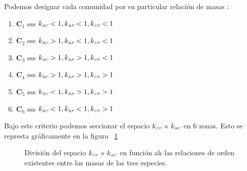 Podemos designar cada comunidad por su particular relaci\'on de masas :
\begin{enumerate}[label=(\alph*)]
\item $\mathbf{C}_1$ sss $k_{\textit{\tiny RC}} < 1 , k_{\textit{\tiny RP}} < 1 ,k_{\textit{\tiny CP}} < 1$
\item $\mathbf{C}_2$ sss $k_{\textit{\tiny RC}} > 1 , k_{\textit{\tiny RP}} < 1 ,k_{\textit{\tiny CP}} < 1$
\item $\mathbf{C}_3$ sss $k_{\textit{\tiny RC}} > 1 , k_{\textit{\tiny RP}} > 1 ,k_{\textit{\tiny CP}} < 1$
\item $\mathbf{C}_4$ sss $k_{\textit{\tiny RC}} > 1 , k_{\textit{\tiny RP}} > 1 ,k_{\textit{\tiny CP}} > 1$
\item $\mathbf{C}_5$ sss $k_{\textit{\tiny RC}} < 1 , k_{\textit{\tiny RP}} > 1 ,k_{\textit{\tiny CP}} > 1$
\item $\mathbf{C}_6$ sss $k_{\textit{\tiny RC}} < 1 , k_{\textit{\tiny RP}} < 1 ,k_{\textit{\tiny CP}} > 1$
\end{enumerate}

Bajo este criterio podemos seccionar el espacio $k_{\textit{\tiny CP}} \times k_{\textit{\tiny RC}}$ en 6 zonas. Esto se represta gr\'aficamente en la figura ~\ref{fig:ZonasSR}

\begin{figure}[h!]
  \centering
  
  \caption{Divisi\'on del espacio $k_{\textit{\tiny CP}} \times k_{\textit{\tiny RC}}$ en funci\'on ah las relaciones de orden existentes entre las masas de las tres especies.}
\label{fig:ZonasSR}
\end{figure}
  







